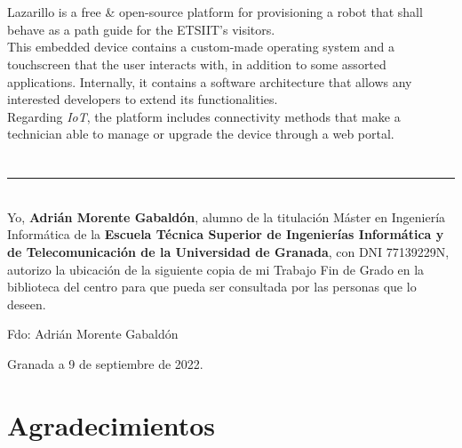 \\

\vspace{0.7cm}
\\

Lazarillo is a free \& open-source platform for provisioning a robot that shall behave as a path guide for the ETSIIT's visitors.\\

This embedded device contains a custom-made operating system and a touchscreen that the user interacts with, in addition to some assorted applications. Internally, it contains a software architecture that allows any interested developers to extend its functionalities.\\

Regarding \textit{IoT}, the platform includes connectivity methods that make a technician able to manage or upgrade the device through a web portal.

\chapter*{}
\thispagestyle{empty}

\noindent\rule[-1ex]{\textwidth}{2pt}\\[4.5ex]

Yo, \textbf{Adrián Morente Gabaldón}, alumno de la titulación Máster en Ingeniería Informática de la \textbf{Escuela Técnica Superior de Ingenierías Informática y de Telecomunicación de la Universidad de Granada}, con DNI 77139229N, autorizo la ubicación de la siguiente copia de mi Trabajo Fin de Grado en la biblioteca del centro para que pueda ser consultada por las personas que lo deseen.

\vspace{6cm}

\noindent Fdo: Adrián Morente Gabaldón

\vspace{2cm}

\begin{flushright}
Granada a 9 de septiembre de 2022.
\end{flushright}

\chapter*{Agradecimientos}
\thispagestyle{empty}

